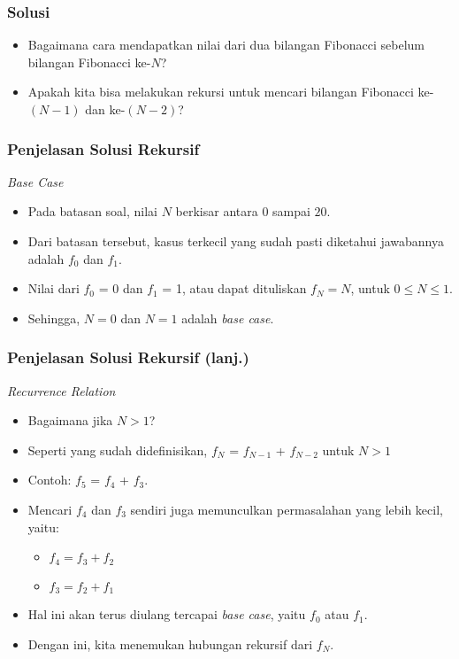 \begin{frame}
\frametitle{Solusi}
\begin{itemize}
  \item Bagaimana cara mendapatkan nilai dari dua bilangan Fibonacci sebelum bilangan Fibonacci ke-$N$?
  \item Apakah kita bisa melakukan rekursi untuk mencari bilangan Fibonacci ke-$(N-1)$ dan ke-$(N-2)$?
\end{itemize}
\end{frame}

\begin{frame}
\frametitle{Penjelasan Solusi Rekursif}
\textit{Base Case}
\begin{itemize}
  \item Pada batasan soal, nilai $N$ berkisar antara $0$ sampai $20$.
  \item Dari batasan tersebut, kasus terkecil yang sudah pasti diketahui jawabannya adalah $f_0$ dan $f_1$.
  \item Nilai dari $f_0$ = 0 dan $f_1$ = 1, atau dapat dituliskan $f_N = N$, untuk $0 \le N \le 1$.
  \item Sehingga, $N=0$ dan $N=1$ adalah \textit{base case}.
\end{itemize}
\end{frame}

\begin{frame}
\frametitle{Penjelasan Solusi Rekursif (lanj.) }
\textit{Recurrence Relation}
\begin{itemize}
  \item Bagaimana jika $N > 1$?
  \item Seperti yang sudah didefinisikan, $f_N$ = $f_{N-1}$ + $f_{N-2}$ untuk $N > 1$
  \item Contoh: $f_5$ = $f_4$ + $f_3$.
  \item Mencari $f_4$ dan $f_3$ sendiri juga memunculkan permasalahan yang lebih kecil, yaitu:
  \begin{itemize}
    \item $f_4 = f_3 + f_2$
    \item $f_3 = f_2 + f_1$ 
  \end{itemize}
  \item Hal ini akan terus diulang tercapai \textit{base case}, yaitu $f_0$ atau $f_1$.
  \item Dengan ini, kita menemukan hubungan rekursif dari $f_N$.
\end{itemize}
\end{frame}

